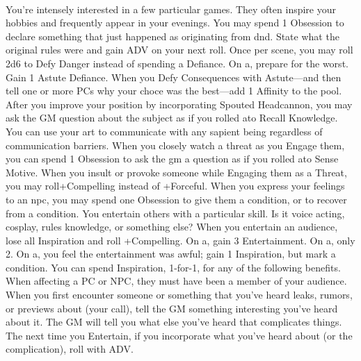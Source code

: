 \documentclass{dw2_playbook}
\begin{document}
\clearpage
~

\pageTwo
    {
      You're intensely interested in a few particular games. They often inspire your hobbies and frequently appear in your evenings.
    }
    {
          {
You may spend 1 Obsession to declare something that just happened as originating from dnd. State what the original rules were and gain ADV on your next roll.
        }
          {
Once per scene, you may roll 2d6 to Defy Danger instead of spending a Defiance.  On a\sixminus, prepare for the worst.
          }
          {
Gain 1 Astute Defiance. When you Defy Consequences with Astute—and then tell one or more PCs why your choce was the best—add 1 Affinity to the pool.
          }
          {
After you improve your position by incorporating Spouted Headcannon, you may ask the GM question about the subject as if you rolled a\tenplus to Recall Knowledge.
          }
          {
You can use your art to communicate with any sapient being regardless of communication barriers.
          }
          {
When you closely watch a threat as you Engage them, you can spend 1 Obsession to ask the gm a question as if you rolled a\tenplus to Sense Motive.
          }
          {
When you insult or provoke someone while Engaging them as a Threat, you may roll+Compelling instead of +Forceful.
          }
          {
When you express your feelings to an npc, you may spend one Obsession to give them a condition, or to recover from a condition.
          }
    }
    {
        {
          You entertain others with a particular skill. Is it voice acting, cosplay, rules knowledge, or something else? When you entertain an audience, lose all Inspiration and roll +Compelling. On a\tenplus, gain 3 Entertainment. On a\sevennine, only 2. On a\sixminus, you feel the entertainment was awful; gain 1 Inspiration, but mark a condition.
          \gap
          You can spend Inspiration, 1-for-1, for any of the following benefits. When affecting a PC or NPC, they must have been a member of your audience.
          \gap
        }
        \gap
        {
          When you first encounter someone or something that you’ve heard leaks, rumors, or previews about (your call), tell the GM something interesting you’ve heard about it. The GM will tell you what else you’ve heard that complicates things. The next time you Entertain, if you incorporate what you’ve heard about (or the complication), roll with ADV.
        }
    }
\end{document}
